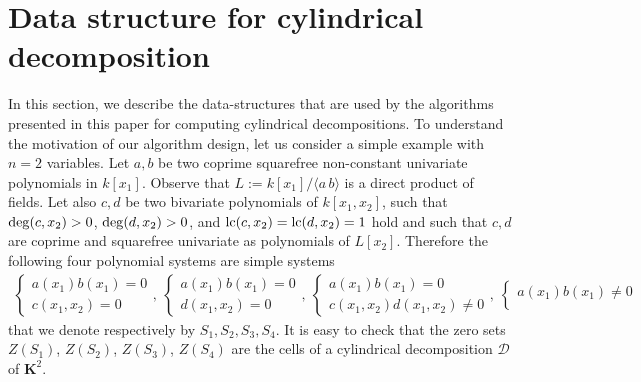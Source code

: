 \documentclass[10pt]{article}
\def\KK {\ensuremath{\mathbf{K}}}
\def\DD {\ensuremath{\mathcal{D}}}
\begin{document}
\section{Data structure for cylindrical decomposition}
\label{sec:datastructure}

In this section, we describe the data-structures
that are used by the algorithms presented in this paper
for computing cylindrical decompositions.
To understand the motivation of our algorithm design, let us
consider a simple example with $n = 2$ variables.
Let $a, b$ 
be two coprime squarefree non-constant univariate polynomials in $k[x_1]$.
Observe that $L := k[x_1] / \langle a \, b \rangle$ is a direct product
of fields.
Let also $c, d$ be two bivariate polynomials 
of $k[x_1, x_2]$, such that
 ${\rm deg}(c,x_2) > 0$, ${\rm deg}(d,x_2) > 0$, 
and ${\rm lc}(c,x_2) =  {\rm lc}(d,x_2) = 1$ hold
and such that $c, d$ are coprime and squarefree univariate
as polynomials of 
$L[x_2]$.
Therefore the following four polynomial systems
are simple systems
\begin{equation*}
\begin{array}{c}
\left\{
\begin{array}{c}
a(x_1) b(x_1) = 0 \\
c(x_1, x_2) = 0
\end{array}
\right., \  
\left\{
\begin{array}{c}
a(x_1) b(x_1) = 0 \\
d(x_1, x_2) = 0
\end{array}
\right., \
\left\{
\begin{array}{c}
a(x_1) b(x_1) = 0 \\
c(x_1, x_2) d(x_1, x_2) \neq 0
\end{array}
\right., \  
\left\{
\begin{array}{c}
a(x_1) b(x_1) \neq 0 \\
\end{array}
\right.
\end{array}
\end{equation*}
that we denote respectively by $S_1, S_2, S_3, S_4$.
It is easy to check that the 
zero sets $Z(S_1)$, $Z(S_2)$, $Z(S_3)$, $Z(S_4)$
are the cells of a cylindrical decomposition ${\DD}$ of ${\KK}^2$.
\end{document}
